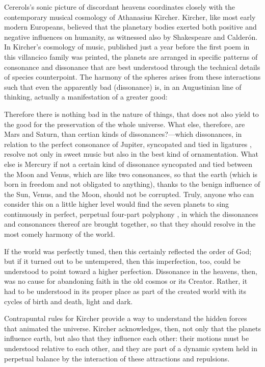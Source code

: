 Cererols's sonic picture of discordant heavens coordinates closely with the
contemporary musical cosmology of Athanasius Kircher.
Kircher, like most early modern Europeans, believed that the planetary bodies
exerted both positive and negative influences on humanity, as witnessed also by
Shakespeare and Calderón.
In Kircher's cosmology of music, published just a year before the first poem in
this villancico family was printed, the planets are arranged in specific
patterns of consonance and dissonance that are best understood through the
technical details of species counterpoint.
The harmony of the spheres arises from these interactions such that even the
apparently bad (dissonance) is, in an Augustinian line of thinking, actually a
manifestation of a greater good:
\begin{quoting}
	Therefore there is nothing bad in the nature of things, that does not
	also yield to the good for the preservation of the whole universe.
	What else, therefore, are Mars and Saturn, than certian kinds of
        dissonances?---which dissonances, in relation to the perfect consonance
        of Jupiter, syncopated and tied in ligatures , resolve
        not only in sweet music but also in the best kind of ornamentation.
	What else is Mercury if not a certain kind of dissonance syncopated and
	tied between the Moon and Venus, which are like two consonances, so that
	the earth (which is born in freedom and not obligated to anything),
	thanks to the benign influence of the Sun, Venus, and the Moon, should
	not be corrupted.
	Truly, anyone who can consider this on a little higher level would find
	the seven planets to sing continuously in perfect, perpetual four-part
	polyphony , in which the dissonances and
	consonances thereof are brought together, so that they should resolve in
	the most comely harmony of the world.%
        \Autocite[, 383--384]{Kircher:Musurgia}
\end{quoting}

If the world was perfectly tuned, then this certainly reflected the order of
God; but if it turned out to be untempered, then this imperfection, too, could
be understood to point toward a higher perfection.  
Dissonance in the heavens, then, was no cause for abandoning faith in the old
cosmos or its Creator.  
Rather, it had to be understood in its proper place as part of the created
world with its cycles of birth and death, light and dark.

Contrapuntal rules for Kircher provide a way to understand the hidden forces
that animated the universe.%
    \Autocites
    {Gouk:Harmonics}
    {Gouk:MusicScienceMagic}
Kircher acknowledges, then, not only that the planets influence earth, but also
that they influence each other: their motions must be understood relative to
each other, and they are part of a dynamic system held in perpetual balance by
the interaction of these attractions and repulsions.

